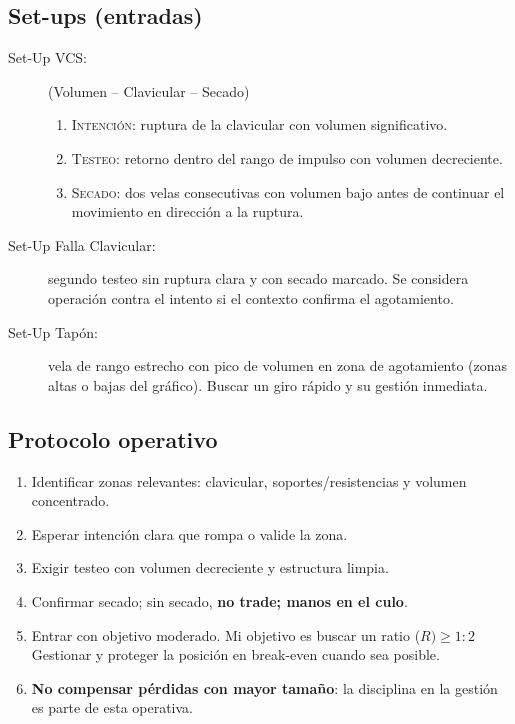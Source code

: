 \subsection*{Set-ups (entradas)}

\begin{description}
  \item[Set-Up VCS:] (Volumen -- Clavicular -- Secado)
    \begin{enumerate}
      \item \textsc{Intención}: ruptura de la clavicular con volumen significativo.
      \item \textsc{Testeo}: retorno dentro del rango de impulso con volumen decreciente.
      \item \textsc{Secado}: dos velas consecutivas con volumen bajo antes de continuar el movimiento en dirección a la ruptura.
    \end{enumerate}
  \item[Set-Up Falla Clavicular:] segundo testeo sin ruptura clara y con secado marcado. Se considera operación contra el intento si el contexto confirma el agotamiento.
  \item[Set-Up Tapón:] vela de rango estrecho con pico de volumen en zona de agotamiento (zonas altas o bajas del gráfico). Buscar un giro rápido y su gestión inmediata.
\end{description}

\subsection*{Protocolo operativo}

\begin{enumerate}
  \item Identificar zonas relevantes: clavicular, soportes/resistencias y volumen concentrado.
  \item Esperar intención clara que rompa o valide la zona.
  \item Exigir testeo con volumen decreciente y estructura limpia.
  \item Confirmar secado; sin secado, \textbf{no trade; manos en el culo}.
  \item Entrar con objetivo moderado. Mi objetivo es buscar un ratio ($R) \ge 1:2$ Gestionar y proteger la posición en break-even cuando sea posible.
  \item \textbf{No compensar pérdidas con mayor tamaño}: la disciplina en la gestión es parte de esta operativa.
\end{enumerate}


